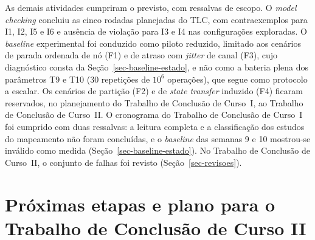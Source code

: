 As demais atividades cumpriram o previsto, com ressalvas de escopo. O \emph{model checking} concluiu as cinco rodadas planejadas do TLC, com contraexemplos para I1, I2, I5 e I6 e ausência de violação para I3 e I4 nas configurações exploradas. O \emph{baseline} experimental foi conduzido como piloto reduzido, limitado aos cenários de parada ordenada de nó (F1) e de atraso com \emph{jitter} de canal (F3), cujo diagnóstico consta da Seção~\ref{sec-baseline-estado}, e não como a bateria plena dos parâmetros T9 e T10 (30 repetições de $10^6$ operações), que segue como protocolo a escalar. Os cenários de partição (F2) e de \emph{state transfer} induzido (F4) ficaram reservados, no planejamento do Trabalho de Conclusão de Curso~I, ao Trabalho de Conclusão de Curso~II. O cronograma do Trabalho de Conclusão de Curso~I foi cumprido com duas ressalvas: a leitura completa e a classificação dos estudos do mapeamento não foram concluídas, e o \emph{baseline} das semanas 9 e 10 mostrou-se inválido como medida (Seção~\ref{sec-baseline-estado}). No Trabalho de Conclusão de Curso~II, o conjunto de falhas foi revisto (Seção~\ref{sec-revisoes}).

\section{Próximas etapas e plano para o Trabalho de Conclusão de Curso II}
\label{sec-proximas-etapas}

